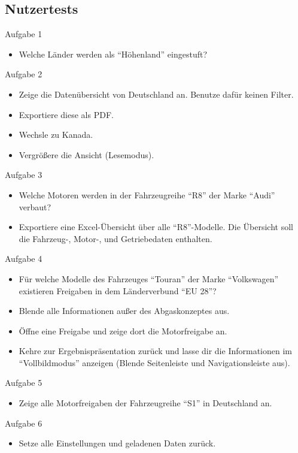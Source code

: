 \subsection{Nutzertests} \label{tasksUser}
Aufgabe 1
\begin{itemize}
	\item Welche Länder werden als \enquote{Höhenland} eingestuft?
\end{itemize}
Aufgabe 2
\begin{itemize}
	\item Zeige die Datenübersicht von Deutschland an. Benutze dafür keinen Filter.
	\item Exportiere diese als PDF.
	\item Wechsle zu Kanada.
	\item Vergrößere die Ansicht (Lesemodus).
\end{itemize}
Aufgabe 3
\begin{itemize}
	\item Welche Motoren werden in der Fahrzeugreihe \enquote{R8} der Marke \enquote{Audi} verbaut?
	\item Exportiere eine Excel-Übersicht über alle \enquote{R8}-Modelle. Die Übersicht soll die Fahrzeug-, Motor-, und Getriebedaten enthalten.
\end{itemize}
Aufgabe 4
\begin{itemize}
	\item Für welche Modelle des Fahrzeuges \enquote{Touran} der Marke \enquote{Volkswagen} existieren Freigaben in dem Länderverbund \enquote{EU 28}?
	\item Blende alle Informationen außer des Abgaskonzeptes aus.
	\item Öffne eine Freigabe und zeige dort die Motorfreigabe an.
	\item Kehre zur Ergebnispräsentation zurück und lasse dir die Informationen im \enquote{Vollbildmodus} anzeigen (Blende Seitenleiste und Navigationsleiste aus). 
\end{itemize}
Aufgabe 5
\begin{itemize}
	\item Zeige alle Motorfreigaben der Fahrzeugreihe \enquote{S1} in Deutschland an.
\end{itemize}
Aufgabe 6
\begin{itemize}
	\item Setze alle Einstellungen und geladenen Daten zurück.
\end{itemize}
